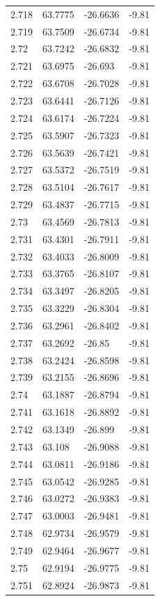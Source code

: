 \begin{tabular}{llll}
2.718 & 63.7775 & -26.6636 & -9.81 \\
2.719 & 63.7509 & -26.6734 & -9.81 \\
2.72 & 63.7242 & -26.6832 & -9.81 \\
2.721 & 63.6975 & -26.693 & -9.81 \\
2.722 & 63.6708 & -26.7028 & -9.81 \\
2.723 & 63.6441 & -26.7126 & -9.81 \\
2.724 & 63.6174 & -26.7224 & -9.81 \\
2.725 & 63.5907 & -26.7323 & -9.81 \\
2.726 & 63.5639 & -26.7421 & -9.81 \\
2.727 & 63.5372 & -26.7519 & -9.81 \\
2.728 & 63.5104 & -26.7617 & -9.81 \\
2.729 & 63.4837 & -26.7715 & -9.81 \\
2.73 & 63.4569 & -26.7813 & -9.81 \\
2.731 & 63.4301 & -26.7911 & -9.81 \\
2.732 & 63.4033 & -26.8009 & -9.81 \\
2.733 & 63.3765 & -26.8107 & -9.81 \\
2.734 & 63.3497 & -26.8205 & -9.81 \\
2.735 & 63.3229 & -26.8304 & -9.81 \\
2.736 & 63.2961 & -26.8402 & -9.81 \\
2.737 & 63.2692 & -26.85 & -9.81 \\
2.738 & 63.2424 & -26.8598 & -9.81 \\
2.739 & 63.2155 & -26.8696 & -9.81 \\
2.74 & 63.1887 & -26.8794 & -9.81 \\
2.741 & 63.1618 & -26.8892 & -9.81 \\
2.742 & 63.1349 & -26.899 & -9.81 \\
2.743 & 63.108 & -26.9088 & -9.81 \\
2.744 & 63.0811 & -26.9186 & -9.81 \\
2.745 & 63.0542 & -26.9285 & -9.81 \\
2.746 & 63.0272 & -26.9383 & -9.81 \\
2.747 & 63.0003 & -26.9481 & -9.81 \\
2.748 & 62.9734 & -26.9579 & -9.81 \\
2.749 & 62.9464 & -26.9677 & -9.81 \\
2.75 & 62.9194 & -26.9775 & -9.81 \\
2.751 & 62.8924 & -26.9873 & -9.81 \\

\end{tabular}
